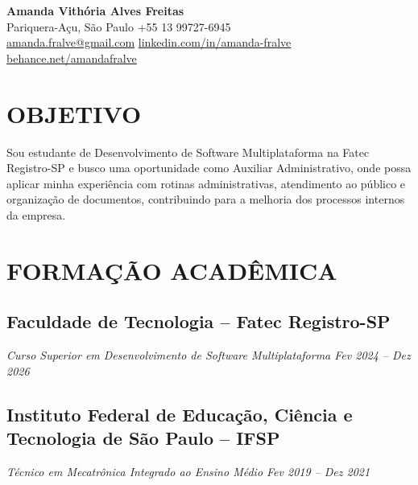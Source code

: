 \documentclass[a4paper,10pt]{article}
\begin{document}
\begin{center}
    {\LARGE \textbf{Amanda Vithória Alves Freitas}}\\[0.1cm]
    Pariquera-Açu, São Paulo \hspace{1mm} {\textbullet} \hspace{1mm} +55 13 99727-6945
    \\[0.2cm] 
    \href{mailto:amanda.fralve@gmail.com}{amanda.fralve@gmail.com}
    \hspace{1mm}{\textbullet}\hspace{1mm}
    \href{https://www.linkedin.com/in/amanda-fralve}{linkedin.com/in/amanda-fralve}
    \hspace{1mm}{\textbullet}\hspace{1mm}
    \href{https://www.behance.net/amandafralve}{behance.net/amandafralve}
\end{center}



\section{OBJETIVO}
Sou estudante de Desenvolvimento de Software Multiplataforma na Fatec Registro-SP e busco uma oportunidade como Auxiliar Administrativo, onde possa aplicar minha experiência com rotinas administrativas, atendimento ao público e organização de documentos, contribuindo para a melhoria dos processos internos da empresa.

\section{FORMAÇÃO ACADÊMICA}

\subsection*{\texorpdfstring{
        \textbf{Faculdade de Tecnologia – Fatec Registro-SP}
    }{
        Fatec Registro
    }}
\textit{Curso Superior em Desenvolvimento de Software Multiplataforma \hfill Fev 2024 – Dez 2026}

\subsection*{\texorpdfstring{
        \textbf{Instituto Federal de Educação, Ciência e Tecnologia de São Paulo – IFSP}
    }{
        IFSP
    }}
\textit{Técnico em Mecatrônica Integrado ao Ensino Médio \hfill Fev 2019 – Dez 2021}
\end{document}
